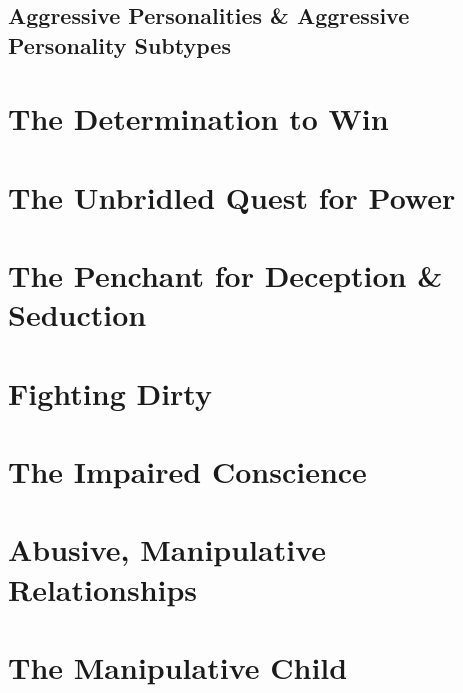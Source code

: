 \documentclass{article}
\numberwithin{equation}{section}
\begin{document}
\subsection{Aggressive Personalities \& Aggressive Personality Subtypes}


\section{The Determination to Win}


\section{The Unbridled Quest for Power}


\section{The Penchant for Deception \& Seduction}


\section{Fighting Dirty}


\section{The Impaired Conscience}


\section{Abusive, Manipulative Relationships}


\section{The Manipulative Child}
\end{document}
